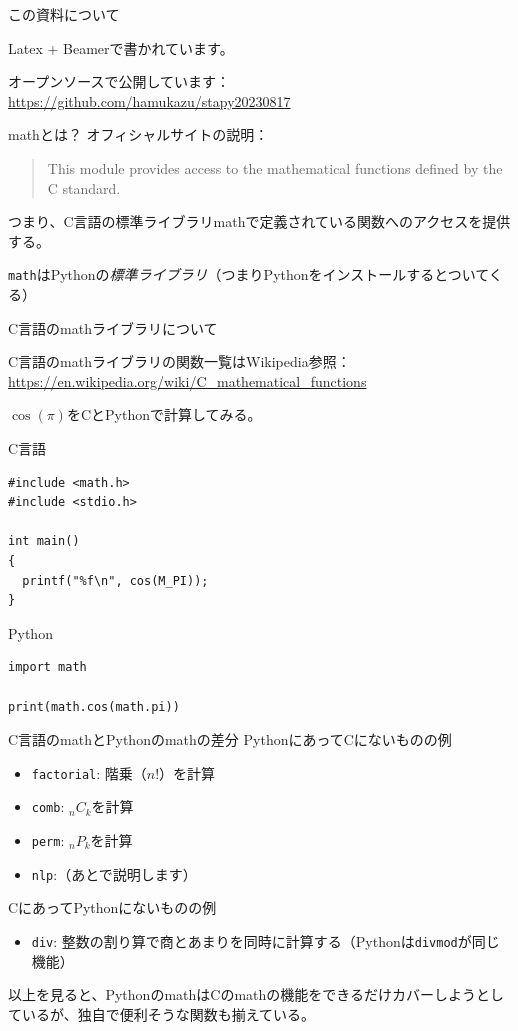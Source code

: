 \documentclass[unicode,lualatex,aspectratio=169]{beamer}
\begin{document}
\begin{frame}[fragile]{この資料について}

  Latex + Beamerで書かれています。
  
  オープンソースで公開しています：\newline
  \url{https://github.com/hamukazu/stapy20230817}
\end{frame}
\begin{frame}[fragile]{mathとは？}
  オフィシャルサイトの説明：
  \begin{quote}
    This module provides access to the mathematical functions defined by the C standard.
  \end{quote}

  つまり、C言語の標準ライブラリmathで定義されている関数へのアクセスを提供する。

  {\tt math}はPythonの\emph{標準ライブラリ}（つまりPythonをインストールするとついてくる）
\end{frame}
\begin{frame}[fragile]{C言語のmathライブラリについて}
  
  C言語のmathライブラリの関数一覧はWikipedia参照：\newline
  {\tiny \url{https://en.wikipedia.org/wiki/C\_mathematical\_functions}}

  $\cos(\pi)$をCとPythonで計算してみる。
  
\begin{minipage}[t]{0.45 \textwidth}
\fontsize{6pt}{6pt}\selectfont    
\noindent  
C言語
\begin{verbatim}
#include <math.h>
#include <stdio.h>

int main()
{
  printf("%f\n", cos(M_PI));
}
\end{verbatim}
\end{minipage}
\begin{minipage}[t]{0.45 \textwidth}
\fontsize{6pt}{6pt}\selectfont    
\noindent  
Python
\begin{verbatim}
import math

print(math.cos(math.pi))
\end{verbatim}
\end{minipage}
\end{frame}
\begin{frame}[fragile]{C言語のmathとPythonのmathの差分}
\noindent
PythonにあってCにないものの例
\begin{itemize}
\item \verb|factorial|: 階乗（$n!$）を計算
\item \verb|comb|: ${}_nC_k$を計算
\item \verb|perm|: ${}_nP_k$を計算
\item \verb|nlp|:（あとで説明します）
\end{itemize}
CにあってPythonにないものの例
\begin{itemize}
\item \verb|div|: 整数の割り算で商とあまりを同時に計算する（Pythonは\verb|divmod|が同じ機能）
\end{itemize}
以上を見ると、PythonのmathはCのmathの機能をできるだけカバーしようとしているが、独自で便利そうな関数も揃えている。
\end{frame}
\end{document}
